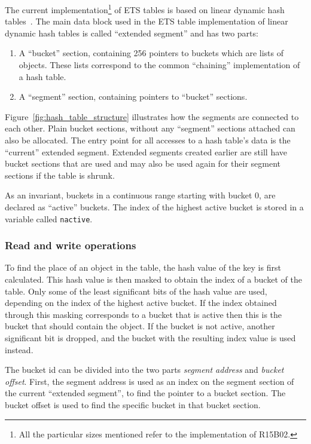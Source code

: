 \documentclass[aps,pre,preprint,nofootinbib]{revtex4}
\begin{document}
The current implementation\footnote{All the particular sizes mentioned refer to the implementation of R15B02.} of ETS tables is based on linear dynamic hash tables~\cite{Larson}.
The main data block used in the ETS table implementation of linear dynamic hash tables is called ``extended segment'' and has two parts:
\begin{enumerate}
\item A ``bucket'' section, containing 256 pointers to buckets which are lists of objects.
  These lists correspond to the common ``chaining'' implementation of a hash table.
\item A ``segment'' section, containing pointers to ``bucket'' sections.
\end{enumerate}
Figure~\ref{fig:hash_table_structure} illustrates how the segments are connected to each other. 
Plain bucket sections, without any ``segment'' sections attached can also be allocated.
The entry point for all accesses to a hash table's data is the ``current'' extended segment. 
Extended segments created earlier are still have bucket sections that are used and may also be used again for their segment sections if the table is shrunk.

As an invariant, buckets in a continuous range starting with bucket 0, are declared as ``active'' buckets.
The index of the highest active bucket is stored in a variable called \verb|nactive|.

\subsubsection{Read and write operations}

To find the place of an object in the table, the hash value of the key is first calculated.
This hash value is then masked to obtain the index of a bucket of the table.
Only some of the least significant bits of the hash value are used, depending on the index of the highest active bucket.
If the index obtained through this masking corresponds to a bucket that is active then this is the bucket that should contain the object.
If the bucket is not active, another significant bit is dropped, and the bucket with the resulting index value is used instead.
 

The bucket id can be divided into the two parts \emph{segment address} and \emph{bucket offset}.
First, the segment address is used as an index on the segment section of the current ``extended segment'', to find the pointer to a bucket section.
The bucket offset is used to find the specific bucket in that bucket section.
\end{document}
